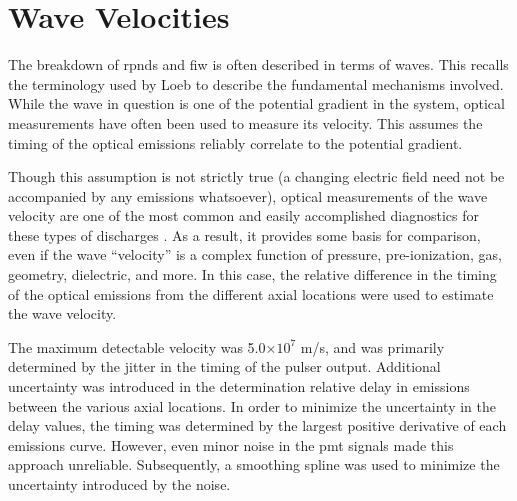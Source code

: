\section{Wave Velocities}

The breakdown of \acs{rpnd}s and \acs{fiw} is often described in terms of waves.
This recalls the terminology used by Loeb \cite{Loeb1965} to describe the
fundamental mechanisms involved. While the wave in question is one of the
potential gradient in the system, optical measurements have often been used to
measure its velocity. This assumes the timing of the optical emissions reliably
correlate to the potential gradient.

Though this assumption is not strictly true (a changing electric field need not
be accompanied by any emissions whatsoever), optical measurements of the wave
velocity are one of the most common and easily accomplished diagnostics for these
types of discharges \cite{Vasilyak1994}. As a result, it provides some basis for
comparison, even if the wave ``velocity'' is a complex function of pressure,
pre-ionization, gas, geometry, dielectric, and more. In this case, the relative
difference in the timing of the optical emissions from the different axial
locations were used to estimate the wave velocity.

The maximum detectable velocity was 5.0$\times10^7$ m/s, and was primarily
determined by the jitter in the timing of the pulser output. Additional
uncertainty was introduced in the determination relative delay in emissions
between the various axial locations. In order to minimize the uncertainty in the
delay values, the timing was determined by the largest positive derivative of
each emissions curve. However, even minor noise in the \acs{pmt} signals made
this approach unreliable. Subsequently, a smoothing spline was used to minimize
the uncertainty introduced by the noise.

